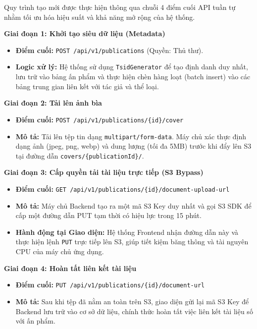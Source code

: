 Quy trình tạo mới được thực hiện thông qua chuỗi 4 điểm cuối API tuần tự nhằm tối ưu hóa hiệu suất và khả năng mở rộng của hệ thống.

\noindent\textbf{Giai đoạn 1: Khởi tạo siêu dữ liệu (Metadata)}
\begin{itemize}
    \item \textbf{Điểm cuối:} \texttt{POST /api/v1/publications} (Quyền: Thủ thư).
    \item \textbf{Logic xử lý:} Hệ thống sử dụng \texttt{TsidGenerator} để tạo định danh duy nhất, lưu trữ vào bảng ấn phẩm và thực hiện chèn hàng loạt (batch insert) vào các bảng trung gian liên kết với tác giả và thể loại.
\end{itemize}

\noindent\textbf{Giai đoạn 2: Tải lên ảnh bìa}
\begin{itemize}
    \item \textbf{Điểm cuối:} \texttt{POST /api/v1/publications/\{id\}/cover}
    \item \textbf{Mô tả:} Tải lên tệp tin dạng \texttt{multipart/form-data}. Máy chủ xác thực định dạng ảnh (jpeg, png, webp) và dung lượng (tối đa 5MB) trước khi đẩy lên S3 tại đường dẫn \texttt{covers/\{publicationId\}/}.
\end{itemize}

\noindent\textbf{Giai đoạn 3: Cấp quyền tải tài liệu trực tiếp (S3 Bypass)}
\begin{itemize}
    \item \textbf{Điểm cuối:} \texttt{GET /api/v1/publications/\{id\}/document-upload-url}
    \item \textbf{Mô tả:} Máy chủ Backend tạo ra một mã S3 Key duy nhất và gọi S3 SDK để cấp một đường dẫn PUT tạm thời có hiệu lực trong 15 phút.
    \item \textbf{Hành động tại Giao diện:} Hệ thống Frontend nhận đường dẫn này và thực hiện lệnh \texttt{PUT} trực tiếp lên S3, giúp tiết kiệm băng thông và tài nguyên CPU của máy chủ ứng dụng.
\end{itemize}

\noindent\textbf{Giai đoạn 4: Hoàn tất liên kết tài liệu}
\begin{itemize}
    \item \textbf{Điểm cuối:} \texttt{PUT /api/v1/publications/\{id\}/document-url}
    \item \textbf{Mô tả:} Sau khi tệp đã nằm an toàn trên S3, giao diện gửi lại mã S3 Key để Backend lưu trữ vào cơ sở dữ liệu, chính thức hoàn tất việc liên kết tài liệu số với ấn phẩm.
\end{itemize}

